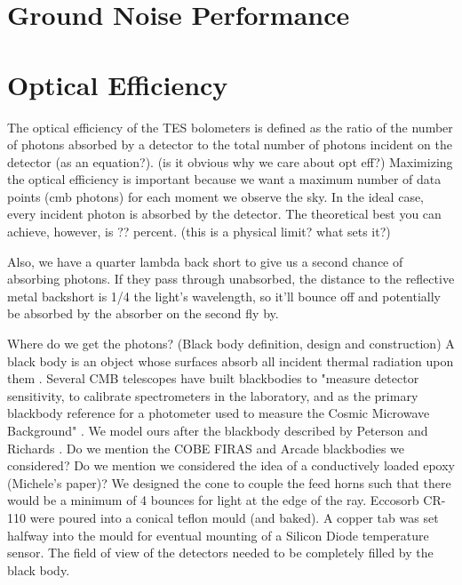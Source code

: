 \section{Ground Noise Performance}
\label{ground_noise_section}



\section{Optical Efficiency}
\label{optical_efficiency_section}

The optical efficiency of the TES bolometers is defined as the ratio of the number of photons absorbed by a detector to the total number of photons incident on the detector (as an equation?). (is it obvious why we care about opt eff?) Maximizing the optical efficiency is important because we want a maximum number of data points (cmb photons) for each moment we observe the sky.  
In the ideal case, every incident photon is absorbed by the detector. The theoretical best you can achieve, however, is ?? percent. (this is a physical limit? what sets it?)

Also, we have a quarter lambda back short to give us a second chance of absorbing photons. If they pass through unabsorbed, the distance to the reflective metal backshort is 1/4 the light's wavelength, so it'll bounce off and potentially be absorbed by the absorber on the second fly by. 

Where do we get the photons? (Black body definition, design and construction)
A black body is an object whose surfaces absorb all incident thermal radiation upon them \cite{Eisberg}. Several CMB telescopes have built blackbodies \cite{} to "measure detector sensitivity, to calibrate spectrometers in the laboratory, and as the primary blackbody reference for a photometer used to measure the Cosmic Microwave Background" \cite{Peterson1984a}. We model ours after the blackbody described by Peterson and Richards \cite{Peterson1984a}. Do we mention the COBE FIRAS and Arcade blackbodies we considered? Do we mention we considered the idea of a conductively loaded epoxy (Michele's paper)? 
We designed the cone to couple the feed horns such that there would be a minimum of 4 bounces for light at the edge of the ray.
Eccosorb CR-110 were poured into a conical teflon mould (and baked). A copper tab was set halfway into the mould for eventual mounting of a Silicon Diode temperature sensor. 
The field of view of the detectors needed to be completely filled by the black body. 

